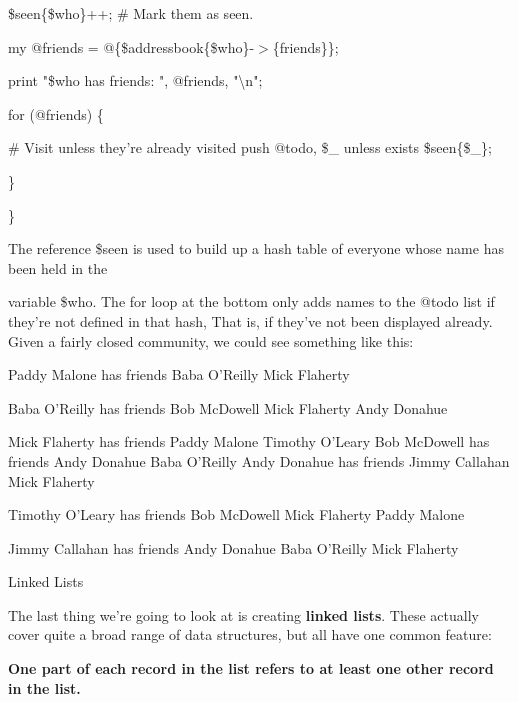 \documentclass[a4paper,11pt]{book}
\begin{document}
\noindent \$seen\{\$who\}++; \# Mark them as seen.

\noindent my @friends = @\{\$addressbook\{\$who\}-$>$\{friends\}\};

\noindent print "\$who has friends: ", @friends, "\textbackslash n";

\noindent for (@friends) \{

\noindent \# Visit unless they're already visited push @todo, \$\_  unless exists \$seen\{\$\_\};

\noindent \}

\noindent \}

\noindent 

\noindent The reference \$seen is used to build up a hash table of everyone whose name has been held in the

\noindent variable \$who. The for loop at the bottom only adds names to the @todo list if they're not defined in that hash, That is, if they've not been displayed already. Given a fairly closed community, we could see something like this:

\noindent 

\noindent 

\noindent Paddy Malone has friends Baba O'Reilly Mick Flaherty

\noindent Baba O'Reilly has friends Bob McDowell Mick Flaherty Andy Donahue

\noindent Mick Flaherty has friends Paddy Malone Timothy O'Leary Bob McDowell has friends Andy Donahue Baba O'Reilly Andy Donahue has friends Jimmy Callahan Mick Flaherty

\noindent Timothy O'Leary has friends Bob McDowell Mick Flaherty Paddy Malone

\noindent Jimmy Callahan has friends Andy Donahue Baba O'Reilly Mick Flaherty

\noindent 

\noindent Linked Lists

\noindent 

\noindent The last thing we're going to look at is creating \textbf{linked lists}. These actually cover quite a broad range of data structures, but all have one common feature:

\noindent 

\noindent 

\noindent \textbf{One part of each record in the list refers to at least one other record in the list.}

\noindent 

\noindent 
\end{document}
